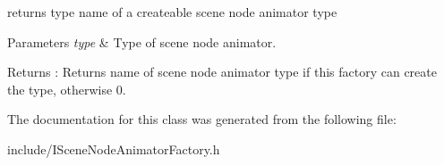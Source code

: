 returns type name of a createable scene node animator type 


\begin{DoxyParams}{Parameters}
{\em type} & Type of scene node animator. \\
\hline
\end{DoxyParams}
\begin{DoxyReturn}{Returns}
\+: Returns name of scene node animator type if this factory can create the type, otherwise 0. 
\end{DoxyReturn}


The documentation for this class was generated from the following file\+:\begin{DoxyCompactItemize}
\item 
include/I\+Scene\+Node\+Animator\+Factory.\+h\end{DoxyCompactItemize}
